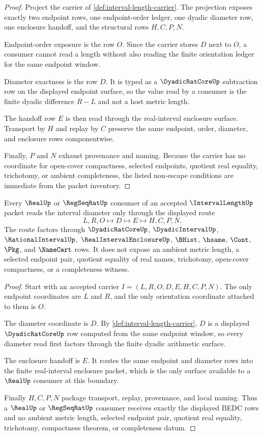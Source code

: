 \begin{proof}
Project the carrier of \autoref{def:interval-length-carrier}. The projection
exposes exactly two endpoint rows, one endpoint-order ledger, one dyadic
diameter row, one enclosure handoff, and the structural rows $H,C,P,N$.

Endpoint-order exposure is the row $O$. Since the carrier stores $D$ next to
$O$, a consumer cannot read a length without also reading the finite
orientation ledger for the same endpoint window.

Diameter exactness is the row $D$. It is typed as a $\DyadicRatCoreUp$
subtraction row on the displayed endpoint surface, so the value read by a
consumer is the finite dyadic difference $R-L$ and not a host metric length.

The handoff row $E$ is then read through the real-interval enclosure surface.
Transport by $H$ and replay by $C$ preserve the same endpoint, order,
diameter, and enclosure rows componentwise.

Finally, $P$ and $N$ exhaust provenance and naming. Because the carrier has
no coordinate for open-cover compactness, selected endpoints, quotient real
equality, trichotomy, or ambient completeness, the listed non-escape
conditions are immediate from the packet inventory.
\end{proof}

\begin{theorem}
\label{thm:interval-length-dyadic-diameter-handoff}
Every $\RealUp$ or $\RegSeqRatUp$ consumer of an accepted
$\IntervalLengthUp$ packet reads the interval diameter only through the
displayed route
$$
L,R,O \longmapsto D \longmapsto E \longmapsto H,C,P,N .
$$
The route factors through $\DyadicRatCoreUp$, $\DyadicIntervalUp$,
$\RationalIntervalUp$, $\RealIntervalEnclosureUp$, $\BHist$, $\hsame$,
$\Cont$, $\Pkg$, and $\NameCert$ rows. It does not expose an ambient metric
length, a selected endpoint pair, quotient equality of real names, trichotomy,
open-cover compactness, or a completeness witness.
\end{theorem}
\begin{proof}
Start with an accepted carrier $I=(L,R,O,D,E,H,C,P,N)$. The only endpoint
coordinates are $L$ and $R$, and the only orientation coordinate attached to
them is $O$.

The diameter coordinate is $D$. By
\autoref{def:interval-length-carrier}, $D$ is a displayed
$\DyadicRatCoreUp$ row computed from the same endpoint window, so every
diameter read first factors through the finite dyadic arithmetic surface.

The enclosure handoff is $E$. It routes the same endpoint and diameter rows
into the finite real-interval enclosure packet, which is the only surface
available to a $\RealUp$ consumer at this boundary.

Finally $H,C,P,N$ package transport, replay, provenance, and local naming.
Thus a $\RealUp$ or $\RegSeqRatUp$ consumer receives exactly the displayed
BEDC rows and no ambient metric length, selected endpoint pair, quotient
real equality, trichotomy, compactness theorem, or completeness datum.
\end{proof}


